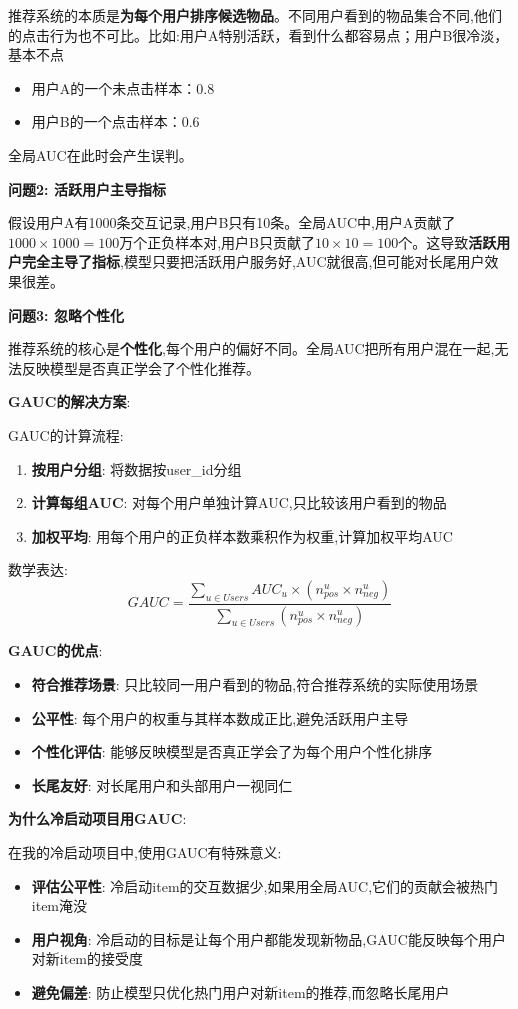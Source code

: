 \documentclass[UTF8]{ctexart}
\begin{document}
推荐系统的本质是\textbf{为每个用户排序候选物品}。不同用户看到的物品集合不同,他们的点击行为也不可比。比如:用户A特别活跃，看到什么都容易点；用户B很冷淡，基本不点
\begin{itemize}
    \item 用户A的一个未点击样本：0.8
    \item 用户B的一个点击样本：0.6
\end{itemize}
全局AUC在此时会产生误判。

\textbf{问题2: 活跃用户主导指标}

假设用户A有1000条交互记录,用户B只有10条。全局AUC中,用户A贡献了$1000 \times 1000 = 100$万个正负样本对,用户B只贡献了$10 \times 10 = 100$个。这导致\textbf{活跃用户完全主导了指标},模型只要把活跃用户服务好,AUC就很高,但可能对长尾用户效果很差。

\textbf{问题3: 忽略个性化}

推荐系统的核心是\textbf{个性化},每个用户的偏好不同。全局AUC把所有用户混在一起,无法反映模型是否真正学会了个性化推荐。

\textbf{GAUC的解决方案}:

GAUC的计算流程:
\begin{enumerate}
    \item \textbf{按用户分组}: 将数据按user\_id分组
    \item \textbf{计算每组AUC}: 对每个用户单独计算AUC,只比较该用户看到的物品
    \item \textbf{加权平均}: 用每个用户的正负样本数乘积作为权重,计算加权平均AUC
\end{enumerate}

数学表达:
$$GAUC = \frac{\sum_{u \in Users} AUC_u \times (n_{pos}^u \times n_{neg}^u)}{\sum_{u \in Users} (n_{pos}^u \times n_{neg}^u)}$$

\textbf{GAUC的优点}:
\begin{itemize}
    \item \textbf{符合推荐场景}: 只比较同一用户看到的物品,符合推荐系统的实际使用场景
    \item \textbf{公平性}: 每个用户的权重与其样本数成正比,避免活跃用户主导
    \item \textbf{个性化评估}: 能够反映模型是否真正学会了为每个用户个性化排序
    \item \textbf{长尾友好}: 对长尾用户和头部用户一视同仁
\end{itemize}

\textbf{为什么冷启动项目用GAUC}:

在我的冷启动项目中,使用GAUC有特殊意义:
\begin{itemize}
    \item \textbf{评估公平性}: 冷启动item的交互数据少,如果用全局AUC,它们的贡献会被热门item淹没
    \item \textbf{用户视角}: 冷启动的目标是让每个用户都能发现新物品,GAUC能反映每个用户对新item的接受度
    \item \textbf{避免偏差}: 防止模型只优化热门用户对新item的推荐,而忽略长尾用户
\end{itemize}
\end{document}
